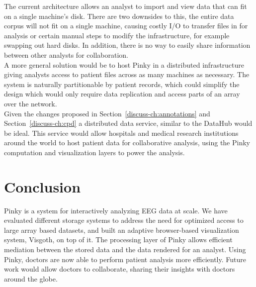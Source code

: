 The current architecture allows an analyst to import and view data that can fit
on a single machine's disk. There are two downsides to this, the entire data
corpus will not fit on a single machine, causing costly I/O to
transfer files in for analysis or certain manual steps to modify the
infrastructure, for example swapping out hard disks. In addition, there is no
way to easily share information between other analysts for collaboration. \\

A more general solution would be to host Pinky in a distributed infrastructure
giving analysts access to patient files across as many machines as necessary.
The system is naturally partitionable by patient records, which could simplify
the design which would only require data replication and access parts of
an array over the network. \\

Given the changes proposed in Section~\ref{discuss-ch:annotations} and
Section~\ref{discuss-ch:cpd} a distributed data service, similar to the
DataHub \cite{datahub} would be ideal. This service would allow hospitals and
medical research institutions around the world to host patient data for
collaborative analysis, using the Pinky computation and visualization layers to
power the analysis.

\section{Conclusion}

Pinky is a system for interactively analyzing EEG data at scale. We have
evaluated different storage systems to address the need for optimized access to
large array based datasets, and built an adaptive browser-based visualization
system, Visgoth, on top of it. The processing layer of Pinky allows efficient
mediation between the stored data and the data rendered for an analyst. Using
Pinky, doctors are now able to perform patient analysis more efficiently.
Future work would allow doctors to collaborate, sharing their insights with
doctors around the globe.

